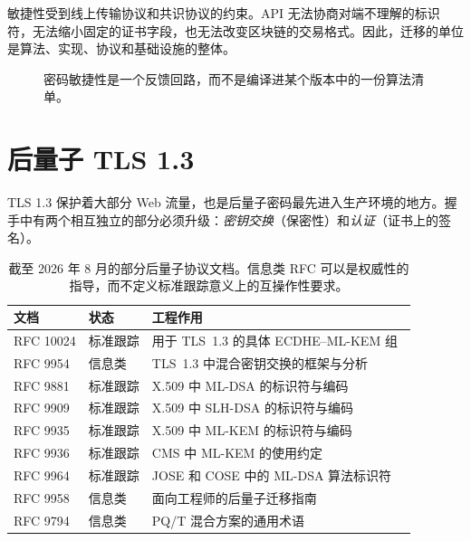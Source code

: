 敏捷性受到线上传输协议和共识协议的约束。API 无法协商对端不理解的标识符，无法缩小固定的证书字段，也无法改变区块链的交易格式。因此，迁移的单位是算法、实现、协议和基础设施的整体。

\begin{figure}[H]
\centering
{}
\caption{密码敏捷性是一个反馈回路，而不是编译进某个版本中的一份算法清单。}
\end{figure}

\section{后量子 TLS 1.3}
TLS 1.3 保护着大部分 Web 流量，也是后量子密码最先进入生产环境的地方。握手中有两个相互独立的部分必须升级：\emph{密钥交换}（保密性）和\emph{认证}（证书上的签名）。

\begin{table}[H]
\centering
\small
\begin{tabular}{p{}p{}p{}}
\toprule
文档 & 状态 & 工程作用 \\
\midrule
RFC 10024 & 标准跟踪 & 用于 TLS~1.3 的具体 ECDHE--ML-KEM 组~\cite{rfc10024} \\
RFC 9954 & 信息类 & TLS~1.3 中混合密钥交换的框架与分析~\cite{rfc9954} \\
RFC 9881 & 标准跟踪 & X.509 中 ML-DSA 的标识符与编码~\cite{rfc9881} \\
RFC 9909 & 标准跟踪 & X.509 中 SLH-DSA 的标识符与编码~\cite{rfc9909} \\
RFC 9935 & 标准跟踪 & X.509 中 ML-KEM 的标识符与编码~\cite{rfc9935} \\
RFC 9936 & 标准跟踪 & CMS 中 ML-KEM 的使用约定~\cite{rfc9936} \\
RFC 9964 & 标准跟踪 & JOSE 和 COSE 中的 ML-DSA 算法标识符~\cite{rfc9964} \\
RFC 9958 & 信息类 & 面向工程师的后量子迁移指南~\cite{rfc9958} \\
RFC 9794 & 信息类 & PQ/T 混合方案的通用术语~\cite{rfc9794} \\
\bottomrule
\end{tabular}
\caption{截至 2026 年 8 月的部分后量子协议文档。信息类 RFC 可以是权威性的指导，而不定义标准跟踪意义上的互操作性要求。}
\label{tab:pqc-protocol-status-2026}
\end{table}

